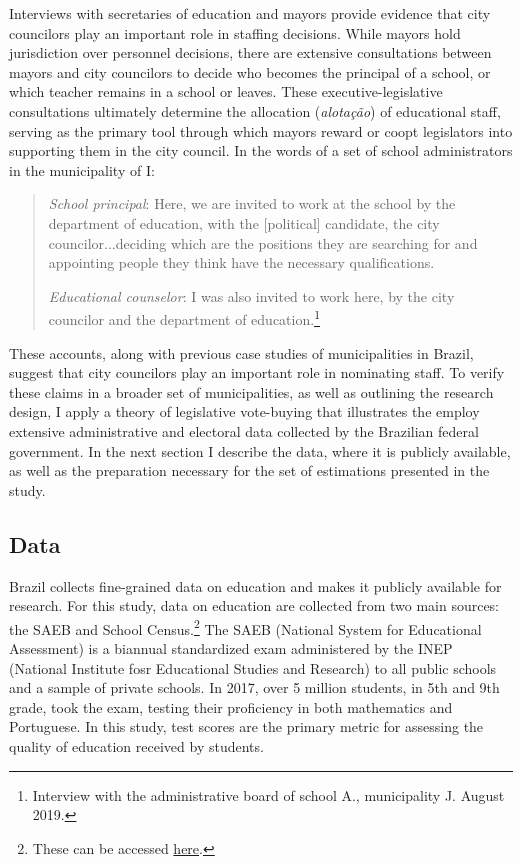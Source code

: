 Interviews with secretaries of education and mayors provide evidence that city councilors play an important role in staffing decisions. While mayors hold jurisdiction over personnel decisions, there are extensive consultations between mayors and city councilors to decide who becomes the principal of a school, or which teacher remains in a school or leaves. These executive-legislative consultations ultimately determine the allocation (\textit{alotação}) of educational staff, serving as the primary tool through which mayors reward or coopt legislators into supporting them in the city council. In the words of a set of school administrators in the municipality of I:

\begin{quote}
    \emph{School principal}: Here, we are invited to work at the school by the department of education, with the [political] candidate, the city councilor...deciding which are the positions they are searching for and appointing people they think have the necessary qualifications.

    \emph{Educational counselor}: I was also invited to work here, by the city councilor and the department of education.\footnote{Interview with the administrative board of school A., municipality J. August 2019.}
\end{quote}

These accounts, along with previous case studies of municipalities in Brazil, suggest that city councilors play an important role in nominating staff. To verify these claims in a broader set of municipalities, as well as outlining the research design, I apply a theory of legislative vote-buying that illustrates the  employ extensive administrative and electoral data collected by the Brazilian federal government. In the next section I describe the data, where it is publicly available, as well as the preparation necessary for the set of estimations presented in the study.

\subsection{Data}

Brazil collects fine-grained data on education and makes it publicly available for research. For this study, data on education are collected from two main sources: the SAEB and School Census.\footnote{These can be accessed \hyperlink{http://portal.inep.gov.br/web/guest/dados}{here}.} The SAEB (National System for Educational Assessment) is a biannual standardized exam administered by the INEP (National Institute fosr Educational Studies and Research) to all public schools and a sample of private schools. In 2017, over 5 million students, in 5th and 9th grade, took the exam, testing their proficiency in both mathematics and Portuguese. In this study, test scores are the primary metric for assessing the quality of education received by students.

